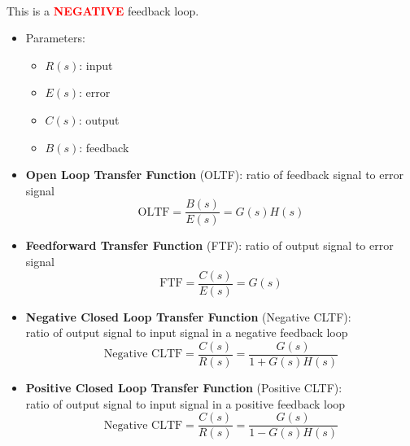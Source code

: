 \documentclass[a4paper]{article}
\begin{document}
\begin{center}
\\
This is a \textcolor{red}{\textbf{NEGATIVE}} feedback loop.
\end{center}

\begin{itemize}
    \item Parameters:
    \begin{itemize}[label=$\circ$]
        \item $R(s)$: input
        \item $E(s)$: error
        \item $C(s)$: output
        \item $B(s)$: feedback
    \end{itemize}
    \item \textbf{Open Loop Transfer Function} (OLTF): ratio of feedback signal to error signal
    $$\text{OLTF} = \frac{B(s)}{E(s)} = G(s)H(s)$$
    \item \textbf{Feedforward Transfer Function} (FTF): ratio of output signal to error signal
    $$\text{FTF} = \frac{C(s)}{E(s)} = G(s)$$
    \item \textbf{Negative Closed Loop Transfer Function} (Negative CLTF): \\ratio of output signal to input signal in a negative feedback loop
    $$\text{Negative CLTF} = \frac{C(s)}{R(s)} = \frac{G(s)}{1+G(s)H(s)}$$
    \item \textbf{Positive Closed Loop Transfer Function} (Positive CLTF): \\ratio of output signal to input signal in a positive feedback loop
    $$\text{Negative CLTF} = \frac{C(s)}{R(s)} = \frac{G(s)}{1-G(s)H(s)}$$
\end{itemize}
\end{document}
